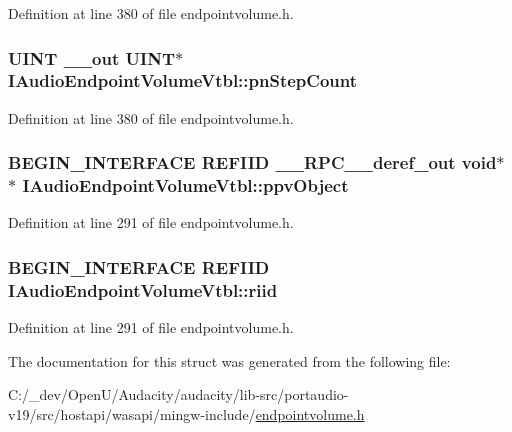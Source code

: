 Definition at line 380 of file endpointvolume.\+h.

\subsubsection[{\texorpdfstring{pn\+Step\+Count}{pnStepCount}}]{ {\bf U\+I\+NT} {\bf \+\_\+\+\_\+out} {\bf U\+I\+NT}$\ast$ I\+Audio\+Endpoint\+Volume\+Vtbl\+::pn\+Step\+Count}\hypertarget{struct_i_audio_endpoint_volume_vtbl_a296158208106e2522202d9e73390508f}{}\label{struct_i_audio_endpoint_volume_vtbl_a296158208106e2522202d9e73390508f}


Definition at line 380 of file endpointvolume.\+h.

\subsubsection[{\texorpdfstring{ppv\+Object}{ppvObject}}]{\setlength{\rightskip}{0pt plus 5cm}B\+E\+G\+I\+N\+\_\+\+I\+N\+T\+E\+R\+F\+A\+CE {\bf R\+E\+F\+I\+ID} {\bf \+\_\+\+\_\+\+R\+P\+C\+\_\+\+\_\+deref\+\_\+out} {\bf void}$\ast$$\ast$ I\+Audio\+Endpoint\+Volume\+Vtbl\+::ppv\+Object}\hypertarget{struct_i_audio_endpoint_volume_vtbl_ac75cbe970aaa66990a92408148b6f272}{}\label{struct_i_audio_endpoint_volume_vtbl_ac75cbe970aaa66990a92408148b6f272}


Definition at line 291 of file endpointvolume.\+h.

\subsubsection[{\texorpdfstring{riid}{riid}}]{\setlength{\rightskip}{0pt plus 5cm}B\+E\+G\+I\+N\+\_\+\+I\+N\+T\+E\+R\+F\+A\+CE {\bf R\+E\+F\+I\+ID} I\+Audio\+Endpoint\+Volume\+Vtbl\+::riid}\hypertarget{struct_i_audio_endpoint_volume_vtbl_acaab0ad572e1c039ce9aef200369333d}{}\label{struct_i_audio_endpoint_volume_vtbl_acaab0ad572e1c039ce9aef200369333d}


Definition at line 291 of file endpointvolume.\+h.



The documentation for this struct was generated from the following file\+:\begin{DoxyCompactItemize}
\item 
C\+:/\+\_\+dev/\+Open\+U/\+Audacity/audacity/lib-\/src/portaudio-\/v19/src/hostapi/wasapi/mingw-\/include/\hyperlink{endpointvolume_8h}{endpointvolume.\+h}\end{DoxyCompactItemize}
